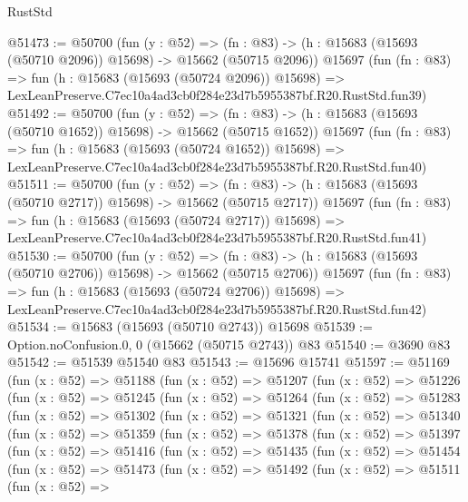 \begin{lexlean}{RustStd}
\begin{coremodule}
@51473 := @50700
    (fun (y : @52) =>
    (fn : @83) -> (h : @15683 (@15693 (@50710 @2096)) @15698) -> @15662 (@50715 @2096))
    @15697
    (fun (fn : @83) =>
    fun (h : @15683 (@15693 (@50724 @2096)) @15698) =>
    LexLeanPreserve.C7ec10a4ad3cb0f284e23d7b5955387bf.R20.RustStd.fun39)
@51492 := @50700
    (fun (y : @52) =>
    (fn : @83) -> (h : @15683 (@15693 (@50710 @1652)) @15698) -> @15662 (@50715 @1652))
    @15697
    (fun (fn : @83) =>
    fun (h : @15683 (@15693 (@50724 @1652)) @15698) =>
    LexLeanPreserve.C7ec10a4ad3cb0f284e23d7b5955387bf.R20.RustStd.fun40)
@51511 := @50700
    (fun (y : @52) =>
    (fn : @83) -> (h : @15683 (@15693 (@50710 @2717)) @15698) -> @15662 (@50715 @2717))
    @15697
    (fun (fn : @83) =>
    fun (h : @15683 (@15693 (@50724 @2717)) @15698) =>
    LexLeanPreserve.C7ec10a4ad3cb0f284e23d7b5955387bf.R20.RustStd.fun41)
@51530 := @50700
    (fun (y : @52) =>
    (fn : @83) -> (h : @15683 (@15693 (@50710 @2706)) @15698) -> @15662 (@50715 @2706))
    @15697
    (fun (fn : @83) =>
    fun (h : @15683 (@15693 (@50724 @2706)) @15698) =>
    LexLeanPreserve.C7ec10a4ad3cb0f284e23d7b5955387bf.R20.RustStd.fun42)
@51534 := @15683 (@15693 (@50710 @2743)) @15698
@51539 := Option.noConfusion.{0, 0} (@15662 (@50715 @2743)) @83
@51540 := @3690 @83
@51542 := @51539 @51540 @83
@51543 := @15696 @15741
@51597 := @51169
    (fun (x : @52) =>
    @51188
      (fun (x : @52) =>
      @51207
        (fun (x : @52) =>
        @51226
          (fun (x : @52) =>
          @51245
            (fun (x : @52) =>
            @51264
              (fun (x : @52) =>
              @51283
                (fun (x : @52) =>
                @51302
                  (fun (x : @52) =>
                  @51321
                    (fun (x : @52) =>
                    @51340
                      (fun (x : @52) =>
                      @51359
                        (fun (x : @52) =>
                        @51378
                          (fun (x : @52) =>
                          @51397
                            (fun (x : @52) =>
                            @51416
                              (fun (x : @52) =>
                              @51435
                                (fun (x : @52) =>
                                @51454
                                  (fun (x : @52) =>
                                  @51473
                                    (fun (x : @52) =>
                                    @51492
                                      (fun (x : @52) =>
                                      @51511
                                        (fun (x : @52) =>

\end{coremodule}
\end{lexlean}
